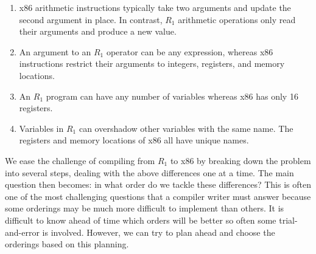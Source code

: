 \documentclass[11pt]{book}
\begin{document}
\begin{enumerate}
\item x86 arithmetic instructions typically take two arguments and
  update the second argument in place. In contrast, $R_1$ arithmetic
  operations only read their arguments and produce a new value.

\item An argument to an $R_1$ operator can be any expression, whereas
  x86 instructions restrict their arguments to integers, registers,
  and memory locations.

\item An $R_1$ program can have any number of variables whereas x86
  has only 16 registers.

\item Variables in $R_1$ can overshadow other variables with the same
  name. The registers and memory locations of x86 all have unique
  names.
\end{enumerate}

We ease the challenge of compiling from $R_1$ to x86 by breaking down
the problem into several steps, dealing with the above differences one
at a time. The main question then becomes: in what order do we tackle
these differences? This is often one of the most challenging questions
that a compiler writer must answer because some orderings may be much
more difficult to implement than others. It is difficult to know ahead
of time which orders will be better so often some trial-and-error is
involved. However, we can try to plan ahead and choose the orderings
based on this planning.
\end{document}
